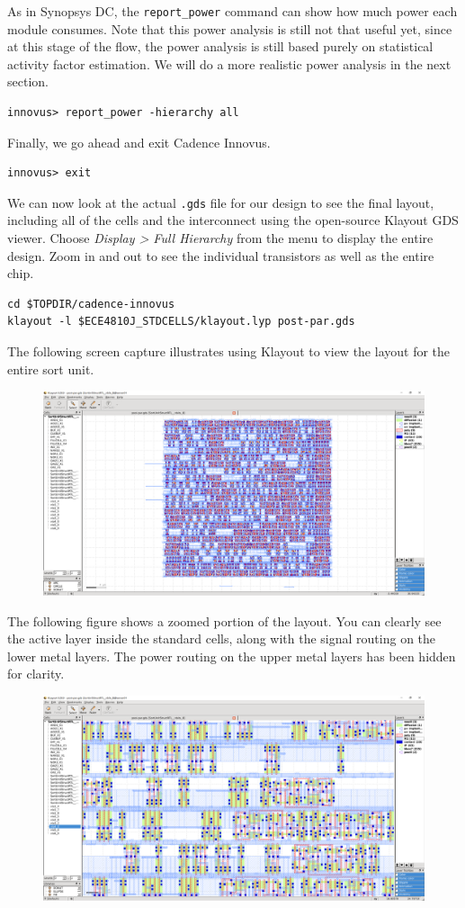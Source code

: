\documentclass[a4paper,12pt,twoside]{article}
\begin{document}
As in Synopsys DC, the \texttt{report\_power} command can show how much power each module consumes. Note that this power analysis is still not that useful yet, since at this stage of the flow, the power analysis is still based purely on statistical activity factor estimation. We will do a more realistic power analysis in the next section.
\begin{verbatim}
innovus> report_power -hierarchy all
\end{verbatim}
Finally, we go ahead and exit Cadence Innovus.
\begin{verbatim}
innovus> exit
\end{verbatim}
We can now look at the actual \texttt{.gds} file for our design to see the final layout, including all of the cells and the interconnect using the open-source Klayout GDS viewer. Choose \textit{Display > Full Hierarchy} from the menu to display the entire design. Zoom in and out to see the individual transistors as well as the entire chip.
\begin{verbatim}
cd $TOPDIR/cadence-innovus
klayout -l $ECE4810J_STDCELLS/klayout.lyp post-par.gds
\end{verbatim}
The following screen capture illustrates using Klayout to view the layout for the entire sort unit.
\begin{figure}[H]
    \centering
    \includegraphics[width=\textwidth]{images/21.png}
\end{figure}
The following figure shows a zoomed portion of the layout. You can clearly see the active layer inside the standard cells, along with the signal routing on the lower metal layers. The power routing on the upper metal layers has been hidden for clarity.
\begin{figure}[H]
    \centering
    \includegraphics[width=\textwidth]{images/22.png}
\end{figure}
\end{document}
